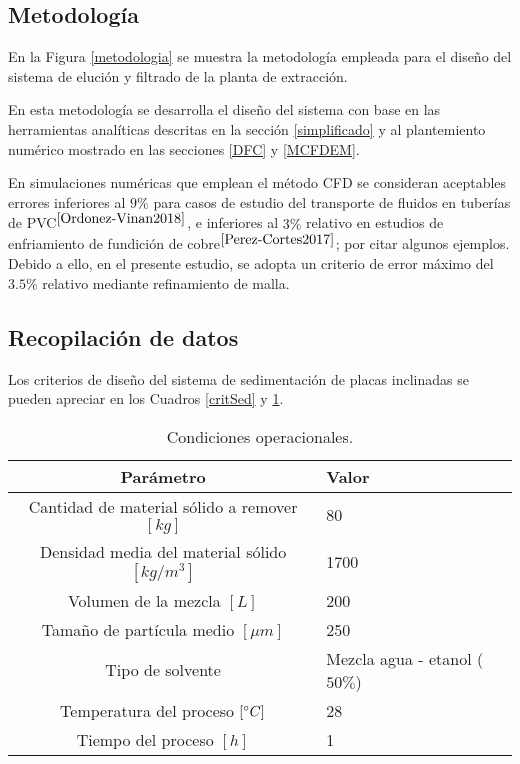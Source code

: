 \begin{center}
	\section{Metodolog\'ia}
\end{center}

\noindent
\justify

En la Figura \ref{metodologia} se muestra la metodolog\'ia empleada para el dise\~no del sistema de eluci\'on y filtrado de la planta de extracci\'on.



\noindent
\justify

En esta metodolog\'ia se desarrolla el dise\~no del sistema con base en las herramientas anal\'iticas descritas en la secci\'on \ref{simplificado} y al plantemiento num\'erico mostrado en las secciones \ref{DFC} y \ref{MCFDEM}.

\noindent
\justify

En simulaciones num\'ericas que emplean el m\'etodo CFD se consideran aceptables errores inferiores al $9 \%$ para casos de estudio del transporte de fluidos en tuber\'ias de PVC$^{\cite{Ordonez-Vinan2018}}$, e inferiores al $3 \%$ relativo en estudios de enfriamiento de fundici\'on de cobre$^{\cite{Perez-Cortes2017}}$; por citar algunos ejemplos. Debido a ello, en el presente estudio, se adopta un criterio de error m\'aximo del $3.5 \%$ relativo mediante refinamiento de malla.

\subsection{Recopilaci\'on de datos}

\noindent
\justify

Los criterios de dise\~no del sistema de sedimentaci\'on de placas inclinadas se pueden apreciar en los Cuadros \ref{critSed} y \ref{condiciones}.

\begin{table}[h!]
	\centering
	\begin{tabular}{c|p{4cm}}
		\hline
		\textbf{Par\'ametro} & \textbf{Valor} \\ \hline
		Cantidad de material s\'olido a remover $[kg]$ & 80 \\ \hline
		Densidad media del material s\'olido $\left[kg / m^3 \right]$ & 1700 \\ \hline
		Volumen de la mezcla $[L]$ & 200 \\ \hline
		Tama\~no de part\'icula medio $[\mu m]$ & 250 \\ \hline
		Tipo de solvente & Mezcla agua - etanol ($50 \%$) \\ \hline
		Temperatura del proceso $[\degree C]$ & 28 \\ \hline
		Tiempo del proceso $[h]$ & 1 \\ \hline
	\end{tabular}
	\caption{Condiciones operacionales.}
	\label{condiciones}
\end{table}

